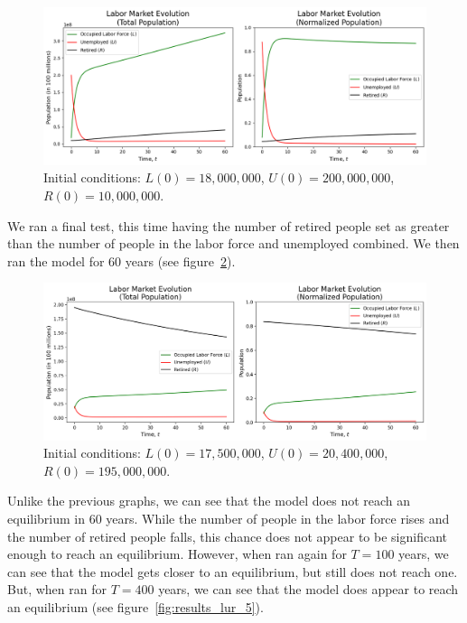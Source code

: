 \documentclass[11pt]{amsart}
\begin{document}
\begin{figure}[h]
    \centering
    \includegraphics[width=\textwidth]{figures/results_lur_3.png}
    \caption{Initial conditions: $L(0) = 18,000,000$, $U(0) = 200,000,000$, $R(0) = 10,000,000$.}
    \label{fig:results_lur_3}
\end{figure}

We ran a final test, this time having the number of retired people set as greater than the number of
people in the labor force and unemployed combined. We then ran the model for 60 years (see figure~\ref{fig:results_lur_4}).

\begin{figure}[h]
    \centering
    \includegraphics[width=\textwidth]{figures/results_lur_4.png}
    \caption{Initial conditions: $L(0) = 17,500,000$, $U(0) = 20,400,000$, $R(0) = 195,000,000$.}
    \label{fig:results_lur_4}
\end{figure}

Unlike the previous graphs, we can see that the model does not reach an equilibrium in 60 years. 
While the number of people in the labor force rises and the number of retired people falls, 
this chance does not appear to be significant enough to reach an equilibrium. However,
when ran again for $T = 100$ years, we can see that the model gets closer to an equilibrium, but 
still does not reach one. But, when ran for $T = 400$ years, we can see that the model 
does appear to reach an equilibrium (see figure~\ref{fig:results_lur_5}).
\end{document}
